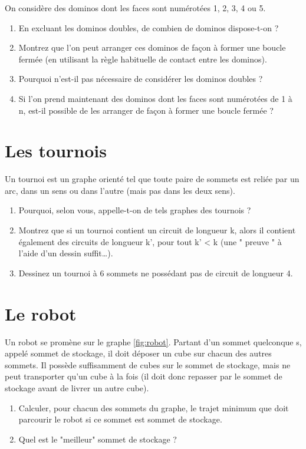 \documentclass{article}[12pt]
\begin{document}
On considère des dominos dont les faces sont numérotées 1, 2, 3, 4 ou 5.

\begin{enumerate}
    \item En excluant les dominos doubles, de combien de dominos dispose-t-on ?
    \item Montrez que l’on peut arranger ces dominos de façon à former une boucle fermée (en utilisant la règle habituelle de contact entre les dominos).
    \item Pourquoi n’est-il pas nécessaire de considérer les dominos doubles ?
    \item Si l’on prend maintenant des dominos dont les faces sont numérotées de 1 à n, est-il possible de les arranger de façon à former une boucle fermée ?
\end{enumerate}


\section*{Les tournois}

Un tournoi est un graphe orienté tel que toute paire de sommets est reliée par un arc, dans un sens ou dans l’autre (mais pas dans les deux sens).

\begin{enumerate}
    \item Pourquoi, selon vous, appelle-t-on de tels graphes des tournois ?
    \item Montrez que si un tournoi contient un circuit de longueur k, alors il contient également des circuits de longueur k', pour tout k' < k (une " preuve " à l’aide d’un dessin suffit…).
    \item Dessinez un tournoi à 6 sommets ne possédant pas de circuit de longueur 4.
\end{enumerate}

\section*{Le robot}
Un robot se promène sur le graphe \ref{fig:robot}. Partant d’un sommet quelconque s, appelé sommet de stockage, il doit déposer un cube sur chacun des autres sommets. Il possède suffisamment de cubes sur le sommet de stockage, mais ne peut transporter qu'un cube à la fois (il doit donc repasser par le sommet de stockage avant de livrer un autre cube).
\begin{enumerate}
    \item Calculer, pour chacun des sommets du graphe, le trajet minimum que doit parcourir le robot si ce sommet est sommet de stockage.
    \item Quel est le "meilleur" sommet de stockage ?
\end{enumerate}
\end{document}
